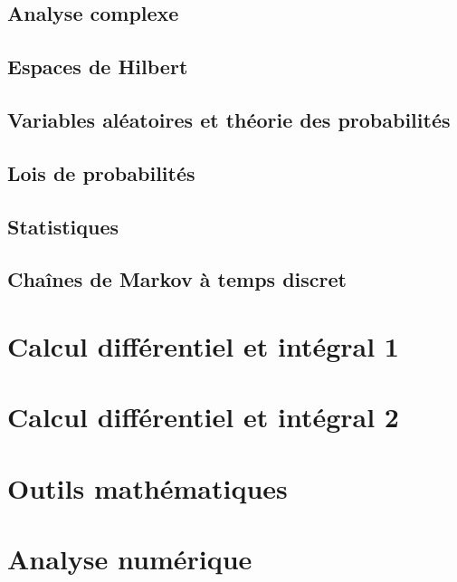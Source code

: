 \chapter{Analyse complexe}


\chapter{Espaces de Hilbert}


\chapter{Variables aléatoires et théorie des probabilités}


\chapter{Lois de probabilités}


\chapter{Statistiques}


\chapter{Chaînes de Markov à temps discret}


%

\part{Calcul différentiel et intégral 1}


\part{Calcul différentiel et intégral 2}


\part{Outils mathématiques}


\part{Analyse numérique}



